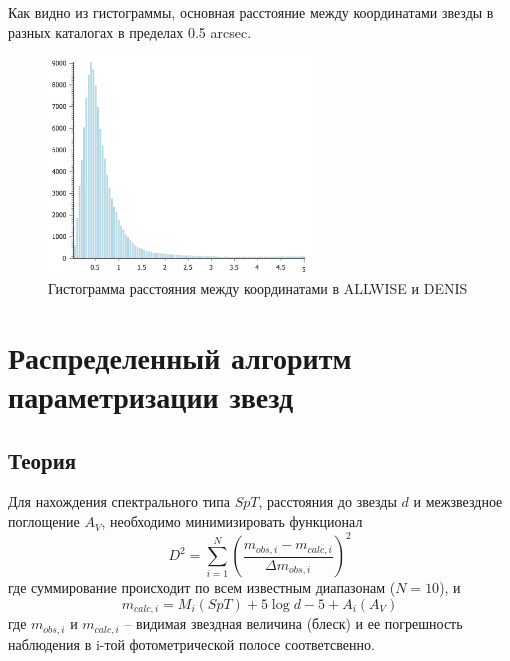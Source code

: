 \documentclass[12pt, a4paper]{article}
\begin{document}
	Как видно из гистограммы, основная расстояние между координатами звезды в разных каталогах в пределах 0.5 arcsec.
	
	\begin{figure}[h]
	\centering
	\includegraphics[width=7cm]{lol}
	\caption{Гистограмма расстояния между координатами в ALLWISE и DENIS}
	\end{figure}
	\section{Распределенный алгоритм параметризации звезд}
	\subsection*{Теория}
	Для нахождения спектрального типа $SpT$, расстояния до звезды $d$ и межзвездное поглощение $A_V$, необходимо минимизировать функционал
	$$
	D^2 = \sum_{i=1}^N \left(\frac{m_{obs,i}-m_{calc,i}}{\Delta m_{obs,i}} \right)^2
	$$
	где суммирование происходит по всем известным диапазонам ($N = 10$), и
	$$
	m_{calc,i} = M_i(SpT) + 5 \log d - 5 + A_i(A_V)
	$$
	где $m_{obs,i}$ и $m_{calc,i}$ -- видимая звездная величина (блеск) и ее погрешность наблюдения в i-той фотометрической полосе соответсвенно.
\end{document}
